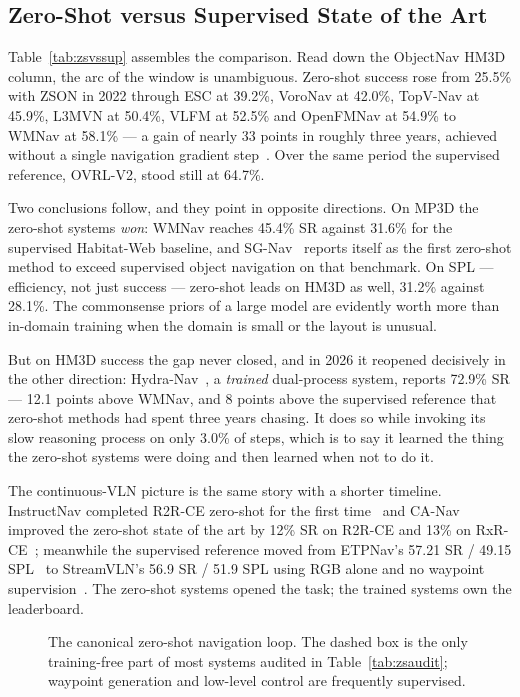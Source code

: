 \documentclass[journal]{IEEEtran}
\begin{document}
\subsection{Zero-Shot versus Supervised State of the Art}
Table~\ref{tab:zsvssup} assembles the comparison. Read down the ObjectNav
HM3D column, the arc of the window is unambiguous. Zero-shot success rose
from 25.5\% with ZSON in 2022 through ESC at 39.2\%, VoroNav at 42.0\%,
TopV-Nav at 45.9\%, L3MVN at 50.4\%, VLFM at 52.5\% and OpenFMNav at 54.9\%
to WMNav at 58.1\% --- a gain of nearly 33 points in roughly three years,
achieved without a single navigation gradient
step~\cite{nie2025wmnav}. Over the same period the supervised reference,
OVRL-V2, stood still at 64.7\%.

Two conclusions follow, and they point in opposite directions. On MP3D the
zero-shot systems \emph{won}: WMNav reaches 45.4\% SR against 31.6\% for
the supervised Habitat-Web baseline, and SG-Nav~\cite{yin2024online}
reports itself as the first zero-shot method to exceed supervised object
navigation on that benchmark. On SPL --- efficiency, not just success ---
zero-shot leads on HM3D as well, 31.2\% against 28.1\%. The commonsense
priors of a large model are evidently worth more than in-domain training
when the domain is small or the layout is unusual.

But on HM3D success the gap never closed, and in 2026 it reopened
decisively in the other direction: Hydra-Nav~\cite{wang2026hydra}, a
\emph{trained} dual-process system, reports 72.9\% SR --- 12.1 points above
WMNav, and 8 points above the supervised reference that zero-shot methods
had spent three years chasing. It does so while invoking its slow reasoning
process on only 3.0\% of steps, which is to say it learned the thing the
zero-shot systems were doing and then learned when not to do it.

The continuous-VLN picture is the same story with a shorter timeline.
InstructNav completed R2R-CE zero-shot for the first
time~\cite{long2024instructnav} and CA-Nav improved the zero-shot state of
the art by 12\% SR on R2R-CE and 13\% on
RxR-CE~\cite{chen2025constraint}; meanwhile the supervised reference moved
from ETPNav's 57.21 SR / 49.15 SPL~\cite{an2025etpnav} to StreamVLN's
56.9 SR / 51.9 SPL using RGB alone and no waypoint
supervision~\cite{wei2025streamvln}. The zero-shot systems opened the task;
the trained systems own the leaderboard.

\begin{figure}[!t]
  \centering
  \resizebox{0.95\columnwidth}{!}{}
  \caption{The canonical zero-shot navigation loop. The dashed box is the
  only training-free part of most systems audited in
  Table~\ref{tab:zsaudit}; waypoint generation and low-level control are
  frequently supervised.}
  \label{fig:zsloop}
\end{figure}
\end{document}
